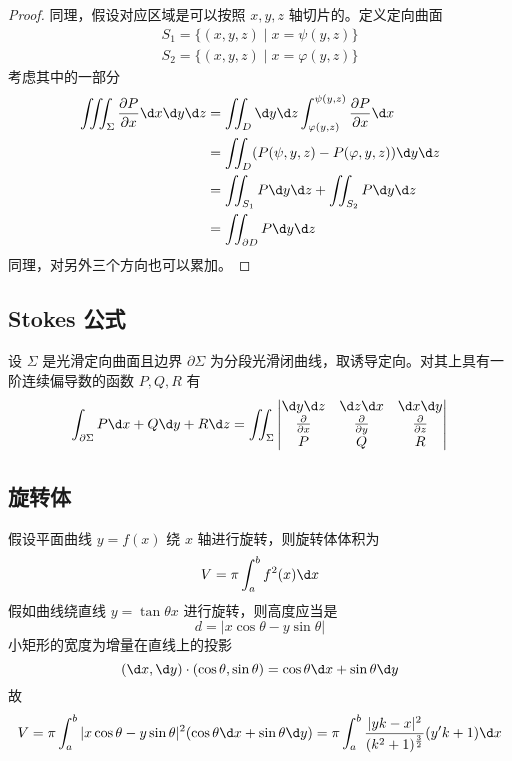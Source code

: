 \begin{proof}
	同理，假设对应区域是可以按照 $x, y, z$ 轴切片的。定义定向曲面
	\[ \begin{aligned}
			S_1 = \{ (x, y, z) \mid x = \psi(y, z) \} \\
			S_2 = \{ (x, y, z) \mid x = \varphi(y, z) \}
		\end{aligned} \]
	考虑其中的一部分
	\[ \begin{aligned}
			\iiint_\Sigma \frac{\partial P}{\partial x} \d x \d y \d z
			 & = \iint_D \d y \d z \int_{\varphi(y, z)}^{\psi(y, z)} \frac{\partial P}{\partial x} \d x \\
			 & = \iint_D (P(\psi, y, z) - P(\varphi, y, z)) \d y \d z                                   \\
			 & = \iint_{S_1} P \d y \d z + \iint_{S_2} P \d y \d z                                      \\
			 & = \iint_{\partial D} P \d y \d z
		\end{aligned} \]
	同理，对另外三个方向也可以累加。
\end{proof}

\subsection{Stokes 公式}

\begin{theorem}[Stokes 公式]
	设 $\Sigma$ 是光滑定向曲面且边界 $\partial \Sigma$ 为分段光滑闭曲线，取诱导定向。对其上具有一阶连续偏导数的函数 $P, Q, R$ 有
	\[ \int_{\partial \Sigma} P \d x + Q \d y + R \d z = \iint_\Sigma \left| \begin{matrix}
			\d y \d z                   & \d z \d x                   & \d x \d y                   \\
			\frac{\partial}{\partial x} & \frac{\partial}{\partial y} & \frac{\partial}{\partial z} \\
			P                           & Q                           & R
		\end{matrix} \right| \]
\end{theorem}

\subsection{旋转体}

假设平面曲线 $y = f(x)$ 绕 $x$ 轴进行旋转，则旋转体体积为
\[ V = \pi \int_a^b f^2(x) \d x \]
假如曲线绕直线 $y = \tan \theta x$ 进行旋转，则高度应当是
\[ d = |x \cos \theta - y \sin \theta| \]
小矩形的宽度为增量在直线上的投影
\[ (\d x, \d y) \cdot (\cos \theta, \sin \theta) = \cos \theta \d x + \sin \theta \d y \]
故
\[ V = \pi \int_a^b |x \cos \theta - y \sin \theta|^2(\cos \theta \d x + \sin \theta \d y) = \pi \int_a^b \frac{|yk-x|^2}{(k^2+1)^{\frac{3}{2}}}(y'k+1) \d x \]

